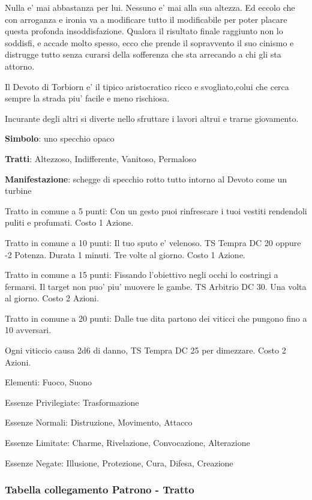 \documentclass[a4paper,11pt,twoside,openany]{book}
\begin{document}
{Nulla e' mai abbastanza per lui. Nessuno e' mai alla sua altezza. Ed eccolo che con arroganza e ironia va a modificare tutto il modificabile per poter placare questa profonda insoddisfazione. Qualora il risultato finale raggiunto non lo soddisfi, e accade molto spesso, ecco che prende il sopravvento il suo cinismo e distrugge tutto senza curarsi della sofferenza che sta arrecando a chi gli sta attorno.

Il Devoto di Torbiorn e' il tipico aristocratico ricco e svogliato,colui che cerca sempre la strada piu' facile e meno rischiosa.

Incurante degli altri si diverte nello sfruttare i lavori altrui e trarne giovamento.

\textbf{Simbolo}: uno specchio opaco

\textbf{Tratti}: Altezzoso, Indifferente, Vanitoso, Permaloso

\textbf{Manifestazione}: schegge di specchio rotto tutto intorno al Devoto come un turbine

\bigskip

Tratto in comune a 5 punti: Con un gesto puoi rinfrescare i tuoi vestiti rendendoli puliti e profumati. Costo 1 Azione.

Tratto in comune a 10 punti: Il tuo sputo e' velenoso. TS Tempra DC 20 oppure -2 Potenza. Durata 1 minuti. Tre volte al giorno. Costo 1 Azione.

Tratto in comune a 15 punti: Fissando l'obiettivo negli occhi lo costringi a fermarsi. Il target non puo' piu' muovere le gambe. TS Arbitrio DC 30. Una volta al giorno. Costo 2 Azioni.

Tratto in comune a 20 punti: Dalle tue dita partono dei viticci che pungono fino a 10 avversari.

Ogni viticcio causa 2d6 di danno, TS Tempra DC 25 per dimezzare. Costo 2 Azioni.

\bigskip

Elementi: Fuoco, Suono

\bigskip

Essenze Privilegiate: Trasformazione

Essenze Normali: Distruzione, Movimento, Attacco

Essenze Limitate: Charme, Rivelazione, Convocazione, Alterazione

Essenze Negate: Illusione, Protezione, Cura, Difesa, Creazione

\subsubsection{Tabella collegamento Patrono - Tratto}

}
\end{document}
